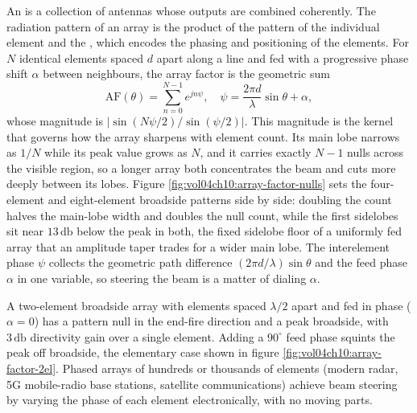 

An  is a collection of antennas whose outputs
are combined coherently. The radiation pattern of an array is the
product of the pattern of the individual element and the
, which encodes the phasing and positioning of
the elements. For $N$ identical elements spaced $d$ apart along a line
and fed with a progressive phase shift $\alpha$ between neighbours, the
array factor is the geometric sum
\[
\text{AF}(\theta) = \sum_{n=0}^{N-1} e^{jn\psi}, \quad \psi =
\frac{2\pi d}{\lambda}\sin\theta + \alpha,
\]
whose magnitude is $|\sin(N\psi/2)/\sin(\psi/2)|$. This magnitude is the
kernel that governs how the array sharpens with element count. Its main
lobe narrows as $1/N$ while its peak value grows as $N$, and it carries
exactly $N-1$ nulls across the visible region, so a longer array both
concentrates the beam and cuts more deeply between its lobes. Figure
\ref{fig:vol04ch10:array-factor-nulls} sets the four-element and
eight-element broadside patterns side by side: doubling the count halves
the main-lobe width and doubles the null count, while the first sidelobes
sit near $13\,\si{\decibel}$ below the peak in both, the fixed sidelobe
floor of a uniformly fed array that an amplitude taper trades for a wider
main lobe. The interelement
phase $\psi$ collects the geometric path difference $(2\pi d/\lambda)
\sin\theta$ and the feed phase $\alpha$ in one variable, so steering the
beam is a matter of dialing $\alpha$.



A two-element broadside array with
elements spaced $\lambda/2$ apart and fed in phase ($\alpha = 0$) has a
pattern null in the end-fire direction and a peak broadside, with
$3\,\si{\decibel}$ directivity gain over a single element. Adding a
$90^{\circ}$ feed phase squints the peak off broadside, the elementary
case shown in figure \ref{fig:vol04ch10:array-factor-2el}. Phased arrays
of hundreds or thousands of elements (modern radar, 5G mobile-radio base
stations, satellite communications) achieve beam steering by varying the
phase of each element electronically, with no moving parts.



